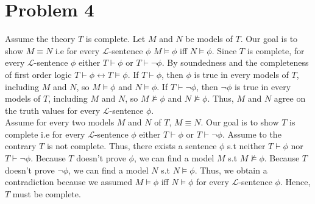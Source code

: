 \documentclass[10pt]{article}
\begin{document}
\section*{Problem 4}
Assume the theory $T$ is complete.
Let $M$ and $N$ be models of $T$.
Our goal is to show $M\equiv N$ i.e for every $\mathcal{L}$-sentence $\phi$ $M\models\phi$ iff $N\models\phi$.
Since $T$ is complete, for every $\mathcal{L}$-sentence $\phi$ either $T\vdash\phi$ or $T\vdash\lnot\phi$.
By soundedness and the completeness of first order logic $T\vdash\phi\leftrightarrow T\models\phi$.
If $T\vdash\phi$, then $\phi$ is true in every models of $T$, including $M$ and $N$, so $M\models\phi$ and $N\models\phi$.
If $T\vdash\lnot\phi$, then $\lnot\phi$ is true in every models of $T$, including $M$ and $N$, so $M\not\models\phi$ and $N\not\models\phi$.
Thus, $M$ and $N$ agree on the truth values for every $\mathcal{L}$-sentence $\phi$.\\
Assume for every two models $M$ and $N$ of $T$, $M\equiv N$.
Our goal is to show $T$ is complete i.e for every $\mathcal{L}$-sentence $\phi$ either $T\vdash\phi$ or $T\vdash\lnot\phi$.
Assume to the contrary $T$ is not complete. Thus, there exists a sentence $\phi$ s.t neither $T\vdash\phi$ nor $T\vdash\lnot\phi$.
Because $T$ doesn't prove $\phi$, we can find a model $M$ s.t $M\not\models\phi$.
Because $T$ doesn't prove $\lnot\phi$, we can find a model $N$ s.t $N\models\phi$.
Thus, we obtain a contradiction because we assumed $M\models\phi$ iff $N\models\phi$ for every $\mathcal{L}$-sentence $\phi$.
Hence, $T$ must be complete.
\end{document}
